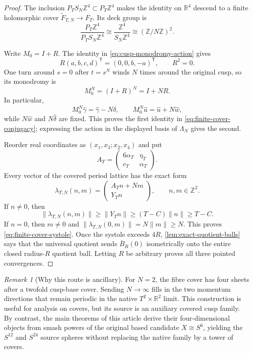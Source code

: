 \documentclass[11pt,letterpaper]{article}
\numberwithin{equation}{section}
\theoremstyle{definition}
\theoremstyle{remark}
\newtheorem{remark}[theorem]{Remark}
\newcommand{\R}{\mathbb R}
\newcommand{\Z}{\mathbb Z}
\begin{document}
\begin{proof}
The inclusion \(P_TS_N\Z^4\subset P_T\Z^4\) makes the identity on
\(\R^4\) descend to a finite holomorphic cover
\(\widetilde F_{T,N}\to F_T\).  Its deck group is
\[
 \frac{P_T\Z^4}{P_TS_N\Z^4}
 \cong\frac{\Z^4}{S_N\Z^4}
 \cong(\Z/N\Z)^2.
\]

Write \(M_0=I+R\).  The identity in
\cref{eq:cusp-monodromy-action} gives
\[
 R(a,b,c,d)^{\mathsf T}=(0,0,b,-a)^{\mathsf T},
 \qquad R^2=0.
\]
One turn around \(s=0\) after \(t=s^N\) winds \(N\) times around the
original cusp, so its monodromy is
\[
 M_0^N=(I+R)^N=I+NR.
\]
In particular,
\[
 M_0^N\widehat\gamma
 =\widehat\gamma-N\widehat\delta,\qquad
 M_0^N\widehat u
 =\widehat u+N\widehat w,
\]
while \(N\widehat w\) and \(N\widehat\delta\) are fixed.  This proves the
first identity in \cref{eq:finite-cover-conjugacy}; expressing the action
in the displayed basis of \(\Lambda_N\) gives the second.

Reorder real coordinates as \((x_1,x_3;x_2,x_4)\) and put
\[
 A_T=
 \begin{pmatrix}
 6\alpha_T&\eta_T\\
 c_T&\alpha_T
 \end{pmatrix}.
\]
Every vector of the covered period lattice has the exact form
\[
 \lambda_{T,N}(n,m)
 =\begin{pmatrix}A_Tn+Nm\\Y_Tn\end{pmatrix},
 \qquad n,m\in\Z^2.
\]
If \(n\ne0\), then
\[
 \|\lambda_{T,N}(n,m)\|
 \geq\|Y_Tn\|\geq(T-C)\|n\|\geq T-C.
\]
If \(n=0\), then \(m\ne0\) and
\(\|\lambda_{T,N}(0,m)\|=N\|m\|\geq N\).  This proves
\cref{eq:finite-cover-systole}.  Once the systole exceeds \(4R\),
\cref{lem:exact-quotient-balls} says that the universal quotient sends
\(\overline B_R(0)\) isometrically onto the entire closed radius-\(R\)
quotient ball.  Letting \(R\) be arbitrary proves all
three pointed convergences.
\end{proof}

\begin{remark}[Why this route is ancillary]
For \(N=2\), the fibre cover has four sheets after a twofold cusp-base
cover.  Sending \(N\to\infty\) fills in the two momentum directions that
remain periodic in the native \(T^2\times\R^2\) limit.  This construction
is useful for analysis on covers, but its source is an auxiliary covered
cusp family.  By contrast, the main theorems of this article derive their
four-dimensional objects from smash powers of the original based
candidate \(X\cong S^6\), yielding the \(S^{12}\) and \(S^{24}\) source
spheres without replacing the native family by a tower of covers.
\end{remark}
\end{document}
